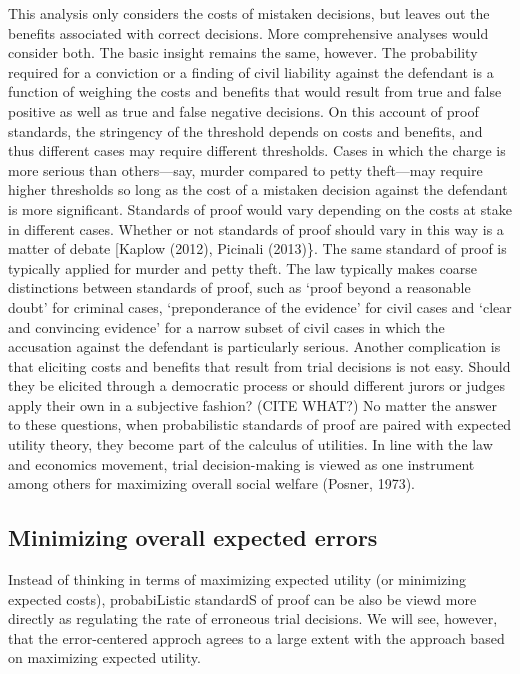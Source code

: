 \documentclass[10pt,dvipsnames]{scrartcl}
\begin{document}
This analysis only considers the costs of mistaken decisions, but leaves
out the benefits associated with correct decisions. More comprehensive
analyses would consider both. The basic insight remains the same,
however. The probability required for a conviction or a finding of civil
liability against the defendant is a function of weighing the costs and
benefits that would result from true and false positive as well as true
and false negative decisions. On this account of proof standards, the
stringency of the threshold depends on costs and benefits, and thus
different cases may require different thresholds. Cases in which the
charge is more serious than others---say, murder compared to petty
theft---may require higher thresholds so long as the cost of a mistaken
decision against the defendant is more significant. Standards of proof
would vary depending on the costs at stake in different cases. Whether
or not standards of proof should vary in this way is a matter of debate
{[}Kaplow (2012), Picinali (2013)\}. The same standard of proof is
typically applied for murder and petty theft. The law typically makes
coarse distinctions between standards of proof, such as `proof beyond a
reasonable doubt' for criminal cases, `preponderance of the evidence'
for civil cases and `clear and convincing evidence' for a narrow subset
of civil cases in which the accusation against the defendant is
particularly serious. Another complication is that eliciting costs and
benefits that result from trial decisions is not easy. Should they be
elicited through a democratic process or should different jurors or
judges apply their own in a subjective fashion? (CITE WHAT?) No matter
the answer to these questions, when probabilistic standards of proof are
paired with expected utility theory, they become part of the calculus of
utilities. In line with the law and economics movement, trial
decision-making is viewed as one instrument among others for maximizing
overall social welfare (Posner, 1973).

\subsection{Minimizing overall expected
errors}\label{minimizing-overall-expected-errors}

Instead of thinking in terms of maximizing expected utility (or
minimizing expected costs), probabiListic standardS of proof can be also
be viewd more directly as regulating the rate of erroneous trial
decisions. We will see, however, that the error-centered approch agrees
to a large extent with the approach based on maximizing expected
utility.
\end{document}
